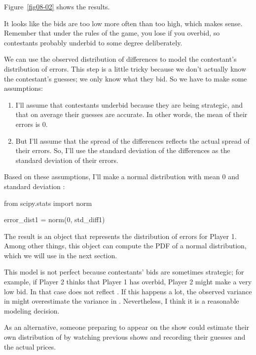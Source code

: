 \documentclass[12pt]{book}
\theoremstyle{exercise}
\begin{document}
Figure~\ref{fig08-02} shows the results.  

It looks like the bids are too low more often than too high, which makes sense.  
Remember that under the rules of the game, you lose if you overbid, so contestants probably underbid to some degree deliberately.

We can use the observed distribution of differences to model the contestant's distribution of errors.
This step is a little tricky because we don't actually know the contestant's guesses; we only know what they bid.
So we have to make some assumptions:

\begin{enumerate}

\item I'll assume that contestants underbid because they are being strategic, and that on average their guesses are accurate.  In other words, the mean of their errors is 0.

\item But I'll assume that the spread of the differences reflects the actual spread of their errors.  So, I'll use the standard deviation of the differences as the standard deviation of their errors.

\end{enumerate}

Based on these assumptions, I'll make a normal distribution with mean 0 and standard deviation :

\begin{code}
from scipy.stats import norm

error_dist1 = norm(0, std_diff1)
\end{code}

The result is an object that represents the distribution of errors for Player 1.
Among other things, this object can compute the PDF of a normal distribution, which we will use in the next section.


This model is not perfect because contestants' bids are sometimes strategic; for example, if Player 2 thinks that Player 1
has overbid, Player 2 might make a very low bid.  
In that case  does not reflect .  
If this happens a lot, the observed variance in  might overestimate the variance in .  
Nevertheless, I think it is a reasonable modeling decision.

As an alternative, someone preparing to appear on the show could
estimate their own distribution of  by watching previous shows
and recording their guesses and the actual prices.
\end{document}
